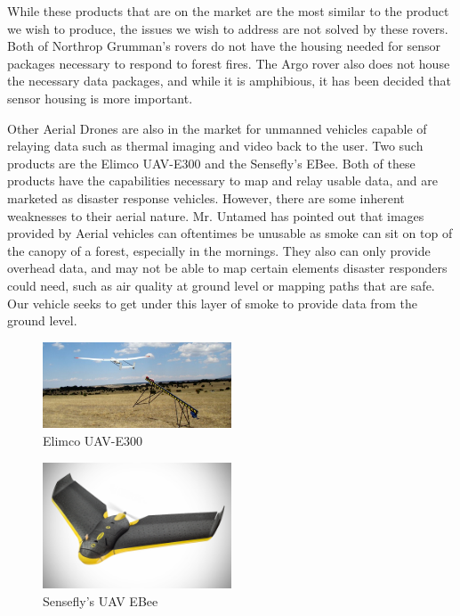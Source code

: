 While these products that are on the market are the most similar to the product we wish to produce, the issues we wish to address are not solved by these rovers. Both of Northrop Grumman's rovers do not have the housing needed for sensor packages necessary to respond to forest fires. The Argo rover also does not house the necessary data packages, and while it is amphibious, it has been decided that sensor housing is more important.

Other Aerial Drones are also in the market for unmanned vehicles capable of relaying data such as thermal imaging and video back to the user. Two such products are the Elimco UAV-E300 and the Sensefly's EBee. Both of these products have the capabilities necessary to map and relay usable data, and are marketed as disaster response vehicles. However, there are some inherent weaknesses to their aerial nature. Mr. Untamed has pointed out that images provided by Aerial vehicles can oftentimes be unusable as smoke can sit on top of the canopy of a forest, especially in the mornings. They also can only provide overhead data, and may not be able to map certain elements disaster responders could need, such as air quality at ground level or mapping paths that are safe. Our vehicle seeks to get under this layer of smoke to provide data from the ground level.

\begin{figure}[H]
\centering
\includegraphics[width=0.5\textwidth]{UAV-E300.jpg}
\caption{Elimco UAV-E300}
\label{fig:ElimcoUAVE300}
\end{figure}

\begin{figure}[H]
\centering
\includegraphics[width=0.5\textwidth]{e-bee.jpg}
\caption{Sensefly's UAV EBee}
\label{fig:SenseflyEBee}
\end{figure}
%
